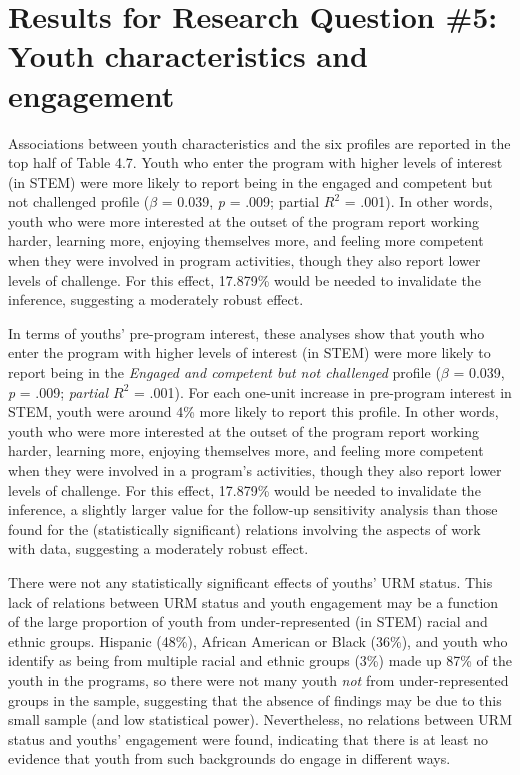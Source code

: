 \documentclass[]{book}
\theoremstyle{definition}
\theoremstyle{definition}
\theoremstyle{definition}
\theoremstyle{remark}
\begin{document}
\section{Results for Research Question \#5: Youth characteristics and
engagement}\label{results-for-research-question-5-youth-characteristics-and-engagement}

Associations between youth characteristics and the six profiles are
reported in the top half of Table 4.7. Youth who enter the program with
higher levels of interest (in STEM) were more likely to report being in
the engaged and competent but not challenged profile (\(\beta\) = 0.039,
\emph{p} = .009; partial \(R^2\) = .001). In other words, youth who were
more interested at the outset of the program report working harder,
learning more, enjoying themselves more, and feeling more competent when
they were involved in program activities, though they also report lower
levels of challenge. For this effect, 17.879\% would be needed to
invalidate the inference, suggesting a moderately robust effect.

In terms of youths' pre-program interest, these analyses show that youth
who enter the program with higher levels of interest (in STEM) were more
likely to report being in the \emph{Engaged and competent but not
challenged} profile (\(\beta\) = 0.039, \emph{p} = .009; \emph{partial
\(R^2\)} = .001). For each one-unit increase in pre-program interest in
STEM, youth were around 4\% more likely to report this profile. In other
words, youth who were more interested at the outset of the program
report working harder, learning more, enjoying themselves more, and
feeling more competent when they were involved in a program's
activities, though they also report lower levels of challenge. For this
effect, 17.879\% would be needed to invalidate the inference, a slightly
larger value for the follow-up sensitivity analysis than those found for
the (statistically significant) relations involving the aspects of work
with data, suggesting a moderately robust effect.

There were not any statistically significant effects of youths' URM
status. This lack of relations between URM status and youth engagement
may be a function of the large proportion of youth from
under-represented (in STEM) racial and ethnic groups. Hispanic (48\%),
African American or Black (36\%), and youth who identify as being from
multiple racial and ethnic groups (3\%) made up 87\% of the youth in the
programs, so there were not many youth \emph{not} from under-represented
groups in the sample, suggesting that the absence of findings may be due
to this small sample (and low statistical power). Nevertheless, no
relations between URM status and youths' engagement were found,
indicating that there is at least no evidence that youth from such
backgrounds do engage in different ways.
\end{document}
